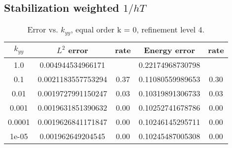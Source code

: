 \documentclass[10pt]{article}
\begin{document}
\subsection{Stabilization weighted $1/hT$}
\begin{figure}[ht]
    \centering
      \scalebox{0.7}{}%
      \scalebox{0.7}{}
      \scalebox{0.7}{}%
      \scalebox{0.7}{}
  \end{figure}

\begin{table}[ht]
\centering
\caption{Error vs. $k_{yy}$, equal order k = 0, refinement level 4.}
\begin{tabular}{c|cc|cc}
$k_{yy}$  &   $L^2$ error       &  rate    & Energy error & rate \\
\hline
1.0     &   0.004944534966171   &      & 0.22174968730798 &      \\
0.1     &   0.0021183557753294  & 0.37 & 0.11080559989653 & 0.30 \\
0.01    &   0.0019727991150247  & 0.03 & 0.10319891306733 & 0.03 \\
0.001   &   0.0019631851390632  & 0.00 & 0.10252741678786 & 0.00 \\
0.0001  &   0.0019626841171847  & 0.00 & 0.10246145295711 & 0.00 \\
1e-05   &   0.001962649204545   & 0.00 & 0.10245487005308 & 0.00 \\
\end{tabular}                             
\end{table}

  \begin{figure}[ht]
    \centering
      \scalebox{0.7}{}%
      \scalebox{0.7}{}
      \scalebox{0.7}{}%
      \scalebox{0.7}{}
      \scalebox{0.7}{}%
      \scalebox{0.7}{}
  \end{figure}

  \begin{figure}[ht]
    \centering
      \scalebox{0.7}{}%
      \scalebox{0.7}{}
      \scalebox{0.7}{}%
      \scalebox{0.7}{}
      \scalebox{0.7}{}%
      \scalebox{0.7}{}
  \end{figure}
\end{document}
